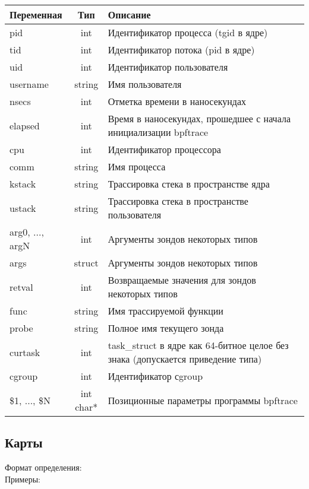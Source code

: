 \begin{tabular}{|l|c|p{8cm}|}
\hline
\rowcolor{gray!40}
Переменная & Тип & Описание \\
\hline
pid & int & Идентификатор процесса (tgid в ядре) \\
\hline
tid & int & Идентификатор потока (pid в ядре) \\
\hline
uid & int & Идентификатор пользователя \\
\hline
username & string & Имя пользователя \\
\hline
nsecs & int & Отметка времени в наносекундах \\
\hline
elapsed & int & Время в наносекундах, прошедшее с начала инициализации bpftrace \\
\hline
cpu & int & Идентификатор процессора \\
\hline
comm & string & Имя процесса \\
\hline
kstack & string & Трассировка стека в пространстве ядра \\
\hline
ustack & string & Трассировка стека в пространстве пользователя \\
\hline
arg0, ..., argN & int & Аргументы зондов некоторых типов \\
\hline
args & struct & Аргументы зондов некоторых типов \\
\hline
retval & int & Возвращаемые значения для зондов некоторых типов \\
\hline
func & string & Имя трассируемой функции \\
\hline
probe & string & Полное имя текущего зонда \\
\hline
curtask & int & task\_struct в ядре как 64-битное целое без знака (допускается приведение типа) \\
\hline
cgroup & int & Идентификатор сgroup  \\
\hline
\$1, ..., \$N & \makecell[c]{int \\ char*} & Позиционные параметры программы bpftrace \\
\hline
\end{tabular}


\subsection{Карты}
Формат определения: \\
Примеры: \\

